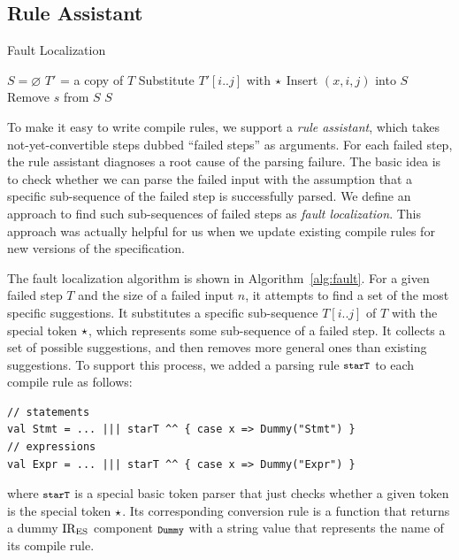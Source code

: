 \subsection{Rule Assistant}
\begin{algorithm}[t]
  \caption{Fault Localization}\label{alg:fault}
  \begin{algorithmic}[1]
    \State $S = \varnothing$
    \State $T'$ = a copy of $T$
    \State Substitute $T'[i..j]$ with $\star$
    \State Insert $(x, i, j)$ into $S$
    \EndIf
    \EndFor
    \EndFor
    \State Remove $s$ from $S$
    \EndIf
    \EndWhile
    \State \Return $S$
    \EndFunction
  \end{algorithmic}
\end{algorithm}

To make it easy to write compile rules, we support a \textit{rule assistant},
which takes not-yet-convertible steps dubbed ``failed steps'' as arguments.
For each failed step, the rule assistant diagnoses a root cause of the
parsing failure.  The basic idea is to check whether we can parse the
failed input with the assumption that a specific sub-sequence of the
failed step is successfully parsed.  We define an approach to find
such sub-sequences of failed steps as \textit{fault localization}.
This approach was actually helpful for us when we update existing
compile rules for new versions of the specification.

The fault localization algorithm is shown in Algorithm~\ref{alg:fault}.
For a given failed step $T$ and the size of a failed input $n$, it
attempts to find a set of the most specific suggestions.  It
substitutes a specific sub-sequence \( T[i..j] \) of \( T \) with the
special token \( \star \), which represents some sub-sequence of a
failed step.  It collects a set of possible suggestions, and then
removes more general ones than existing suggestions.  To support this
process, we added a parsing rule  \( \texttt{\footnotesize starT} \) to each compile
rule as follows:
\begin{lstlisting}[style=myScalastyle]
// statements
val Stmt = ... ||| starT ^^ { case x => Dummy("Stmt") }
// expressions
val Expr = ... ||| starT ^^ { case x => Dummy("Expr") }
\end{lstlisting}
where \( \texttt{\footnotesize starT} \) is a special basic token parser that just
checks whether a given token is the special token \( \star \). 
Its corresponding conversion rule is a function that returns a dummy
\( \text{IR}_\text{ES} \) component \( \texttt{\footnotesize Dummy} \) with a string value that
represents the name of its compile rule.

